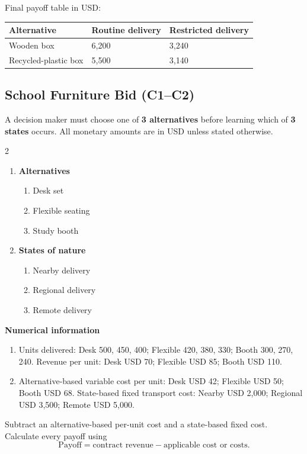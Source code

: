 Final payoff table in USD:
\begin{center}
\begin{tabular}{lll}
\toprule
Alternative & Routine delivery & Restricted delivery \\
\midrule
Wooden box & 6{,}200 & 3{,}240 \\
Recycled-plastic box & 5{,}500 & 3{,}140 \\
\bottomrule
\end{tabular}
\end{center}
\subsection{School Furniture Bid (C1--C2)}
\label{sec:problem16-school-furniture-bid-c1-c2}
A decision maker must choose one of \textbf{3 alternatives} before learning which of \textbf{3 states} occurs. All monetary amounts are in USD unless stated otherwise.
\begin{multicols}{2}
\begin{enumerate}[label=\arabic*.]
 \item \textbf{Alternatives}
 \begin{enumerate}[label=\roman*)]
  \item Desk set
  \item Flexible seating
  \item Study booth
 \end{enumerate}
 \item \textbf{States of nature}
 \begin{enumerate}[label=\roman*)]
  \item Nearby delivery
  \item Regional delivery
  \item Remote delivery
 \end{enumerate}
\end{enumerate}
\end{multicols}
 \textbf{Numerical information}
 \begin{enumerate}[label=\roman*)]
  \item Units delivered: Desk 500, 450, 400; Flexible 420, 380, 330; Booth 300, 270, 240. Revenue per unit: Desk USD 70; Flexible USD 85; Booth USD 110.
  \item Alternative-based variable cost per unit: Desk USD 42; Flexible USD 50; Booth USD 68. State-based fixed transport cost: Nearby USD 2,000; Regional USD 3,500; Remote USD 5,000.
 \end{enumerate}
Subtract an alternative-based per-unit cost and a state-based fixed cost. Calculate every payoff using
\[
 \text{Payoff}=\text{contract revenue}-\text{applicable cost or costs}.
\]

